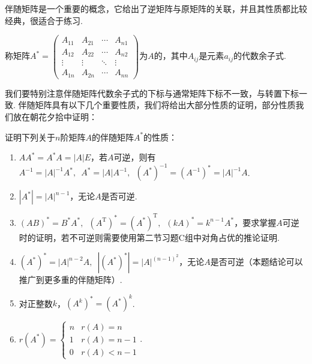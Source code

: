 伴随矩阵是一个重要的概念，它给出了逆矩阵与原矩阵的关联，并且其性质都比较经典，很适合于练习.
\begin{definition}
    称矩阵$A^*=\begin{pmatrix}
            A_{11} & A_{21} & \cdots & A_{n1} \\
            A_{12} & A_{22} & \cdots & A_{n2} \\
            \vdots & \vdots & \ddots & \vdots \\
            A_{1n} & A_{2n} & \cdots & A_{nn}
        \end{pmatrix}$为$A$的，其中$A_{ij}$是元素$a_{ij}$的代数余子式.
\end{definition}
我们要特别注意伴随矩阵代数余子式的下标与通常矩阵下标不一致，与转置下标一致. 伴随矩阵具有以下几个重要性质，我们将给出大部分性质的证明，部分性质我们放在朝花夕拾中证明：
\begin{example} \label{ex:13:伴随矩阵}
    证明下列关于$n$阶矩阵$A$的伴随矩阵$A^*$的性质：
    \begin{enumerate}
        \item \label{item:13:伴随矩阵:1}
              $AA^*=A^*A=|A|E$，若$A$可逆，则有$A^{-1}=|A|^{-1}A^*,\enspace A^*=|A|A^{-1},\enspace (A^*)^{-1}=(A^{-1})^*=|A|^{-1}A$.

        \item $|A^*|=|A|^{n-1}$，无论$A$是否可逆.

        \item \label{item:13:伴随矩阵:3}
              $(AB)^*=B^*A^*,\enspace (A^\mathrm{T})^*=(A^*)^\mathrm{T},\enspace (kA)^*=k^{n-1}A^*$，要求掌握$A$可逆时的证明，若不可逆则需要使用第二节习题C组中对角占优的推论证明.

        \item $(A^*)^*=|A|^{n-2}A,\enspace |(A^*)^*|=|A|^{(n-1)^2}$，无论$A$是否可逆（本题结论可以推广到更多重的伴随矩阵）.

        \item 对正整数$k$，$(A^k)^*=(A^*)^k$.

        \item $r(A^*)=\begin{cases}
                      n & r(A)=n     \\
                      1 & r(A)=n-1   \\
                      0 & r(A) < n-1
                  \end{cases}$.
    \end{enumerate}
\end{example}


